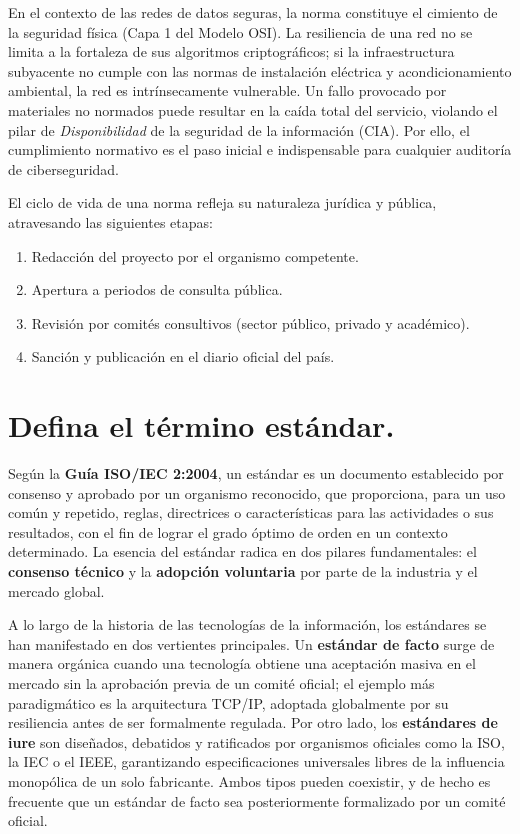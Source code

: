 \documentclass[a4paper,12pt]{article}
\begin{document}
En el contexto de las redes de datos seguras, la norma constituye el cimiento de la seguridad física (Capa 1 del Modelo OSI). La resiliencia de una red no se limita a la fortaleza de sus algoritmos criptográficos; si la infraestructura subyacente no cumple con las normas de instalación eléctrica y acondicionamiento ambiental, la red es intrínsecamente vulnerable. Un fallo provocado por materiales no normados puede resultar en la caída total del servicio, violando el pilar de \textit{Disponibilidad} de la seguridad de la información (CIA). Por ello, el cumplimiento normativo es el paso inicial e indispensable para cualquier auditoría de ciberseguridad.

El ciclo de vida de una norma refleja su naturaleza jurídica y pública, atravesando las siguientes etapas:
\begin{enumerate}
    \item Redacción del proyecto por el organismo competente.
    \item Apertura a periodos de consulta pública.
    \item Revisión por comités consultivos (sector público, privado y académico).
    \item Sanción y publicación en el diario oficial del país.
\end{enumerate}

\newpage

\section{Defina el término estándar.}

Según la \textbf{Guía ISO/IEC 2:2004}, un estándar es un documento establecido por consenso y aprobado por un organismo reconocido, que proporciona, para un uso común y repetido, reglas, directrices o características para las actividades o sus resultados, con el fin de lograr el grado óptimo de orden en un contexto determinado. La esencia del estándar radica en dos pilares fundamentales: el \textbf{consenso técnico} y la \textbf{adopción voluntaria} por parte de la industria y el mercado global.

A lo largo de la historia de las tecnologías de la información, los estándares se han manifestado en dos vertientes principales. Un \textbf{estándar de facto} surge de manera orgánica cuando una tecnología obtiene una aceptación masiva en el mercado sin la aprobación previa de un comité oficial; el ejemplo más paradigmático es la arquitectura TCP/IP, adoptada globalmente por su resiliencia antes de ser formalmente regulada. Por otro lado, los \textbf{estándares de iure} son diseñados, debatidos y ratificados por organismos oficiales como la ISO, la IEC o el IEEE, garantizando especificaciones universales libres de la influencia monopólica de un solo fabricante. Ambos tipos pueden coexistir, y de hecho es frecuente que un estándar de facto sea posteriormente formalizado por un comité oficial.
\end{document}
